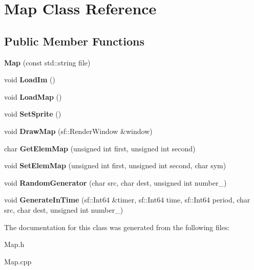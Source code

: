 \hypertarget{class_map}{}\section{Map Class Reference}
\label{class_map}
\subsection*{Public Member Functions}
\begin{DoxyCompactItemize}
\item 
\mbox{\label{class_map_a1ac0ad9071d24a65b842f0e2dd74d986}} 
{\bfseries Map} (const std\+::string file)
\item 
\mbox{\label{class_map_a707c89f31c87539009b6e89f57dbe167}} 
void {\bfseries Load\+Im} ()
\item 
\mbox{\label{class_map_a6d9f49662f075fc8848ec3a749a95f00}} 
void {\bfseries Load\+Map} ()
\item 
\mbox{\label{class_map_a0b145ae9417d0bea4a410b7fcecf99e1}} 
void {\bfseries Set\+Sprite} ()
\item 
\mbox{\label{class_map_ae32f5ef95701e0556b6c90994a6457d9}} 
void {\bfseries Draw\+Map} (sf\+::\+Render\+Window \&window)
\item 
\mbox{\label{class_map_a6c60ce2101f04b5619efbe6a43f1e2f9}} 
char {\bfseries Get\+Elem\+Map} (unsigned int first, unsigned int second)
\item 
\mbox{\label{class_map_a478d85aca5e3af14cf80c8e9bc9d8bca}} 
void {\bfseries Set\+Elem\+Map} (unsigned int first, unsigned int second, char sym)
\item 
\mbox{\label{class_map_a4fb6aba33b00688ad1faeb0e1ceec9aa}} 
void {\bfseries Random\+Generator} (char src, char dest, unsigned int number\+\_\+)
\item 
\mbox{\label{class_map_a943e70a9e8a4f1715f2c15b9d93e460b}} 
void {\bfseries Generate\+In\+Time} (sf\+::\+Int64 \&timer, sf\+::\+Int64 time, sf\+::\+Int64 period, char src, char dest, unsigned int number\+\_\+)
\end{DoxyCompactItemize}


The documentation for this class was generated from the following files\+:\begin{DoxyCompactItemize}
\item 
Map.\+h\item 
Map.\+cpp\end{DoxyCompactItemize}
